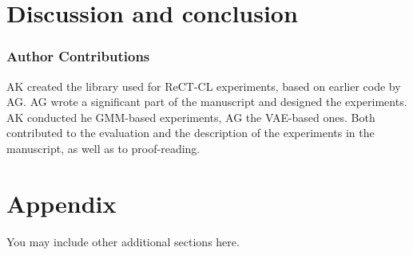 \documentclass{article} %
\begin{document}
\section{Discussion and conclusion}
%
\subsubsection*{Author Contributions}
AK created the library used for ReCT-CL experiments, based on earlier code by AG. AG wrote a significant part of the manuscript and designed the experiments. AK conducted he GMM-based experiments, AG the VAE-based ones. Both contributed to the evaluation and the description of the experiments in the manuscript, as well as to proof-reading.
%
%



\appendix
\section{Appendix}
You may include other additional sections here.
\end{document}
